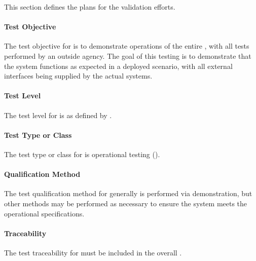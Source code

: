 


This section defines the plans for the \TestIdNameX validation efforts.

\paragraph{Test Objective}
\label{loc:TestObjective\TestIdName}

The test objective for \TestIdNameX is to demonstrate operations of the entire \ThisSys, with all tests performed by an outside agency.
The goal of this testing is to demonstrate that the system functions as expected in a deployed scenario, with all external interfaces being supplied by the actual systems.

\paragraph{Test Level}
\label{loc:TestLevels\TestIdName}

The test level for \TestIdNameX is \StageSeven as defined by \citeStageTestingSTD.

\paragraph{Test Type or Class}
\label{loc:TestType\TestIdName}

The test type or class for \TestIdNameX is operational testing (\StageOT).

\paragraph{Qualification Method}
\label{loc:TestQualificationMethod\TestIdName}

The test qualification method for \TestIdNameX generally is performed via demonstration, but other methods may be performed as necessary to ensure the system meets the operational specifications.

\paragraph{Traceability}
\label{loc:TestTraceability\TestIdName}

The test traceability for \TestIdNameX must be included in the overall \RTVM.

